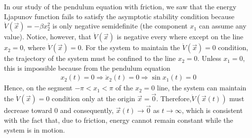 \documentclass[11pt,a4paper,oneside]{book}
\numberwithin{equation}{section}
\theoremstyle{it}
\theoremstyle{definition}
\begin{document}
In our study of the pendulum equation with friction, we saw that the energy 
Ljapunov function fails to satisfy the asymptotic stability condition because 
$\dot{V}(\vec{x}) = -\beta x_2^2$ is only negative semidefinite (the component 
$x_1$ can assume any value). Notice, however, that $\dot{V}(\vec{x})$ is 
negative every where except on the line $x_2=0$, where $\dot{V}(\vec{x})=0$. 
For the system to maintain the $\dot{V}(\vec{x})=0$ condition, the trajectory 
of the system must be confined to the line $x_2=0$. Unless $x_1=0$, this is 
impossible because from the pendulum equation 
\begin{equation*}
	\begin{aligned}
		x_2(t)=0 \Rightarrow\dot{x}_2(t)=0 \Rightarrow\sin x_1(t)=0
	\end{aligned}
\end{equation*}
Hence, on the segment $-\pi<x_1<\pi$ of the $x_2=0$ line, the system can 
maintain the $\dot{V}(\vec{x})=0$ condition only at the origin 
$\vec{x}=\vec{0}$. Therefore,$\dot{V}(\vec{x}(t))$ must decrease toward 0 and 
consequently, $\vec{x}(t)\rightarrow\vec{0}$ as $t\rightarrow\infty$, which is 
consistent with the fact that, due to friction, energy cannot remain constant 
while the system is in motion. 
\end{document}
